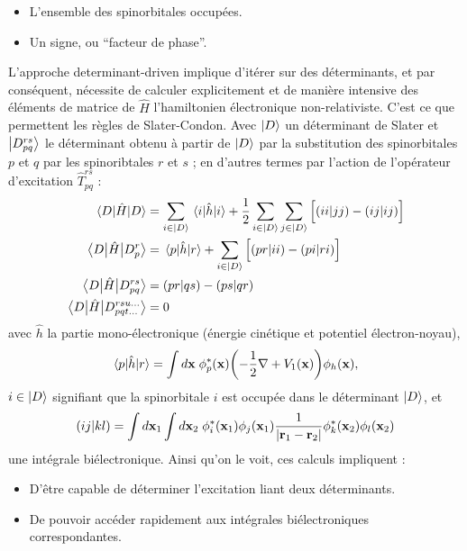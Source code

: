 \documentclass[./thesis.tex]{subfiles}
\begin{document}
\begin{itemize}
\item
L'ensemble des spinorbitales occupées.
\item
Un signe, ou ``facteur de phase''.
\end{itemize}
L'approche determinant-driven implique d'itérer sur des déterminants, et par conséquent, nécessite de calculer explicitement et de manière intensive des éléments de matrice de $\widehat H$ l'hamiltonien électronique non-relativiste.
C'est ce que permettent les règles de Slater-Condon. Avec $\ket D$ un déterminant de Slater et $\ket {D_{pq}^{rs}}$ le déterminant obtenu à partir de $\ket D$ par la substitution des spinorbitales $p$ et $q$ par les spinoribtales $r$ et $s$ ; en d'autres termes par l'action de l'opérateur d'excitation $\hat T_{pq}^{rs}$ :
\begin{align}
\mel{D}{\hat{H}}{D} & = \sum_{i\in \ket{D}} \mel{i}{\hat{h}}{i} + \frac{1}{2} \sum_{i\in \ket{D}} \sum_{j\in \ket{D}} \Big [ (ii|jj) - (ij|ij) \Big ]      \\
\mel{D}{\hat{H}}{D_p^r} & = \mel{p}{\hat{h}}{r} + \sum_{i\in \ket{D}} \Big [ (pr|ii) - (pi|ri) \Big ]        \\
\mel{D}{\hat{H}}{D_{pq}^{rs}} & = (pr|qs) - (ps|qr) \\
\mel{D}{\hat{H}}{D_{pqt \ldots}^{rsu \dots}} & = 0
\end{align}
avec $\hat{h}$ la partie mono-électronique (énergie cinétique et potentiel électron-noyau),
\begin{equation}
\mel{p}{\hat{h}}{r} = \int d{\bf x}\; \phi^*_p(\mathbf{x}) \qty( -\frac{1}{2}\nabla + V_1(\mathbf{x})) \phi_h(\mathbf{x}),
\end{equation}
$i \in \ket{D}$ signifiant que la spinorbitale $i$ est occupée dans le déterminant $\ket{D}$, et
\begin{equation}
(ij|kl) = \int d{\bf x}_1 \int d{\bf x}_2 \; \phi^*_i({\bf x}_1)\phi_j({\bf x}_1) \frac{1}{|{\bf r}_1 - {\bf r}_2|} \phi^*_k({\bf x}_2)\phi_l({\bf x}_2)
\end{equation}
une intégrale biélectronique.
Ainsi qu'on le voit, ces calculs impliquent :
\begin{itemize}
\item
D'être capable de déterminer l'excitation liant deux déterminants.
\item
De pouvoir accéder rapidement aux intégrales biélectroniques correspondantes.
\end{itemize}
\end{document}
